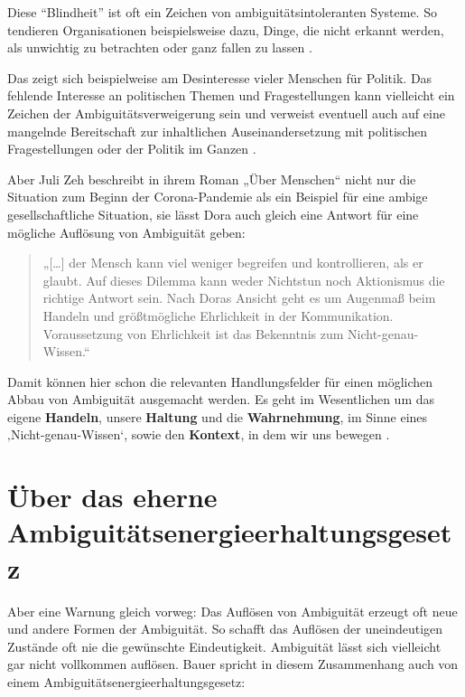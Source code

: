 \documentclass[
  ngerman,
  letterpaper,
  DIV=11]{scrartcl}
\begin{document}
Diese ``Blindheit'' ist oft ein Zeichen von ambiguitätsintoleranten
Systeme. So tendieren Organisationen beispielsweise dazu, Dinge, die
nicht erkannt werden, als unwichtig zu betrachten oder ganz fallen zu
lassen \autocite{bauer2018}.

Das zeigt sich beispielweise am Desinteresse vieler Menschen für
Politik. Das fehlende Interesse an politischen Themen und
Fragestellungen kann vielleicht ein Zeichen der Ambiguitätsverweigerung
sein und verweist eventuell auch auf eine mangelnde Bereitschaft zur
inhaltlichen Auseinandersetzung mit politischen Fragestellungen oder der
Politik im Ganzen \autocite{bauer2018}.

Aber Juli Zeh beschreibt in ihrem Roman „Über Menschen`` nicht nur die
Situation zum Beginn der Corona-Pandemie als ein Beispiel für eine
ambige gesellschaftliche Situation, sie lässt Dora auch gleich eine
Antwort für eine mögliche Auflösung von Ambiguität geben:

\begin{quote}
„{[}\ldots{]} der Mensch kann viel weniger begreifen und kontrollieren,
als er glaubt. Auf dieses Dilemma kann weder Nichtstun noch Aktionismus
die richtige Antwort sein. Nach Doras Ansicht geht es um Augenmaß beim
Handeln und größtmögliche Ehrlichkeit in der Kommunikation.
Voraussetzung von Ehrlichkeit ist das Bekenntnis zum
Nicht-genau-Wissen.`` \autocite[28]{zeh2022}
\end{quote}

Damit können hier schon die relevanten Handlungsfelder für einen
möglichen Abbau von Ambiguität ausgemacht werden. Es geht im
Wesentlichen um das eigene \textbf{Handeln}, unsere \textbf{Haltung} und
die \textbf{Wahrnehmung}, im Sinne eines ‚Nicht-genau-Wissen`, sowie den
\textbf{Kontext}, in dem wir uns bewegen \autocite[vgl.][]{kozica2025}.

\section{Über das eherne
Ambiguitätsenergieerhaltungsgesetz}\label{uxfcber-das-eherne-ambiguituxe4tsenergieerhaltungsgesetz}

Aber eine Warnung gleich vorweg: Das Auflösen von Ambiguität erzeugt oft
neue und andere Formen der Ambiguität. So schafft das Auflösen der
uneindeutigen Zustände oft nie die gewünschte Eindeutigkeit. Ambiguität
lässt sich vielleicht gar nicht vollkommen auflösen. Bauer spricht in
diesem Zusammenhang auch von einem Ambiguitätsenergieerhaltungsgesetz:
\end{document}
